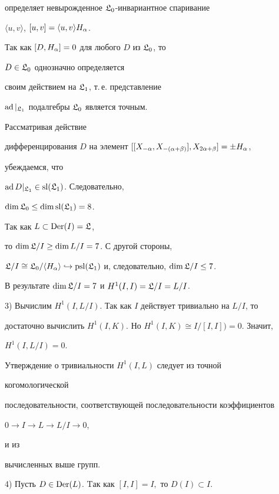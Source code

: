 \begin{pf}
определяет невырожденное $\frak L_0$-инвариантное спаривание 


$\langle u,v\rangle$, $[u,v]=\langle u,v\rangle H_{\alpha}$. 


Так как $[D,H_{\alpha}]=0$ для любого $D$ из $\frak L_0$, то 


$D\in \frak L_0$ однозначно определяется 


своим действием на $\frak L_1$, т.\,е. представление 


$\operatorname{ad}\vert_{\frak L_1}$ подалгебры $\frak L_0$ является точным. 


Рассматривая действие 


дифференцирования $D$ на элемент $[[X_{-\alpha},X_{-(\alpha+\beta)}], X_{2\alpha+\beta}]=\pm H_{\alpha}$, 


убеждаемся, что 


$\operatorname{ad} D\vert_{\frak L_1} \in \operatorname{sl} (\frak L_1)$. Следовательно, 


$\dim \frak L_0\le \dim \operatorname{sl} (\frak L_1)=8$. 


Так как $L \subset \operatorname{Der} (I)=\frak L$, 


то $\dim \frak L/ I \ge \dim L/ I=7$. С другой стороны,


$\frak L/ I\cong \frak L_0/\langle H_{\a}\rangle \hookrightarrow 


\pssl(\frak L_1)$ и, следовательно, $\dim \frak L/ I\le 7$. 


В результате $\dim \frak L/ I= 7$ и $H^{1}(I,I)=\frak L/I=L/I$. 


 


3) Вычислим $H^1(I,L/I)$. Так как $I$ действует тривиально на $L/I$, то 


достаточно вычислить $H^1(I,K)$. Но $H^1(I,K)\cong I/[I,I])=0$. Значит, 


$H^1(I,L/I)=0$. 


Утверждение о тривиальности $H^1(I,L)$ следует из точной 


когомологической 


последовательности, соответствующей последовательности коэффициентов 


$0\longrightarrow I\longrightarrow L\longrightarrow L/I\longrightarrow 


0$, 


и из


вычисленных выше групп. 


 


4) Пусть $D \in\operatorname{Der}(L)$. Tак как $[I,I]=I,$ то $D(I)\subset I$. 



\end{pf}
